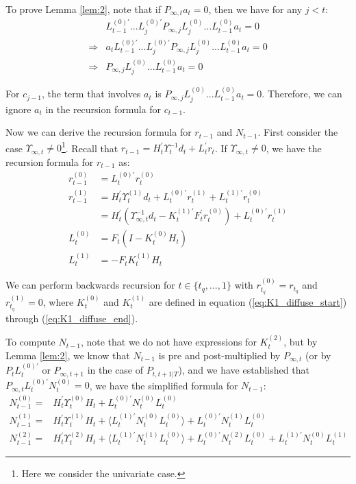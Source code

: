 \documentclass[12pt]{article}
\numberwithin{equation}{section}
\begin{document}
To prove Lemma \ref{lem:2}, note that if $P_{\infty,t}a_t=0$, then we have for any $j<t$:
\begin{align*}
    & L_{t-1}^{(0)'}...L_{j}^{(0)'}P_{\infty,j}L_{j}^{(0)}...L_{t-1}^{(0)}a_t=0 \\
    \Rightarrow & a_tL_{t-1}^{(0)'}...L_{j}^{(0)'}P_{\infty,j}L_{j}^{(0)}...L_{t-1}^{(0)}a_t=0 \\
    \Rightarrow & P_{\infty,j}L_{j}^{(0)}...L_{t-1}^{(0)}a_t=0 
\end{align*}

For $c_{j-1}$, the term that involves $a_t$ is $P_{\infty,j}L_{j}^{(0)}...L_{t-1}^{(0)}a_t=0$. Therefore, we can ignore $a_t$ in the recursion formula for $c_{t-1}$. 

Now we can derive the recursion formula for $r_{t-1}$ and $N_{t-1}$. First consider the case $\Upsilon_{\infty,t}\neq0$\footnote{Here we consider the univariate case.}. Recall that $r_{t-1} = H_t^{'}\Upsilon_{t}^{-1}d_t + L_t^{'}r_t$. If $\Upsilon_{\infty,t}\neq0$, we have the recursion formula for $r_{t-1}$ as:
\begin{align*}
    r_{t-1}^{(0)} &= L_t^{(0)'}r_t^{(0)} \\
    r_{t-1}^{(1)} &= H_t^{'}\Upsilon_{t}^{(1)}d_t+L_t^{(0)'}r_t^{(1)} + L_t^{(1)'}r_t^{(0)} \\
        &= H_t^{'}(\Upsilon_{\infty,t}^{-1}d_t-K_t^{(1)'}F_t^{'}r_t^{(0)}) + L_t^{(0)'}r_t^{(1)} \\
    L_t^{(0)} &= F_t(I-K_t^{(0)}H_t) \\
    L_t^{(1)} &= -F_tK_t^{(1)}H_t 
\end{align*}

We can perform backwards recursion for $t\in\{t_q,...,1\}$ with $r_{t_q}^{(0)}=r_{t_q}$ and $r_{t_q}^{(1)}=0$, where $K_t^{(0)}$ and $K_t^{(1)}$ are defined in equation (\ref{eq:K1_diffuse_start}) through (\ref{eq:K1_diffuse_end}). 

To compute $N_{t-1}$, note that we do not have expressions for $K_t^{(2)}$, but by Lemma \ref{lem:2}, we know that $N_{t-1}$ is pre and post-multiplied by $P_{\infty,t}$ (or by $P_{t}L_{t}^{(0)'}$ or $P_{\infty,t+1}$ in the case of $P_{t,t+1|T}$), and we have established that $P_{\infty,t}L_t^{(0)'}N_{t}^{(0)}=0$, we have the simplified formula for $N_{t-1}$:
\begin{align*}
    N_{t-1}^{(0)} =& H_t^{'}\Upsilon_t^{(0)}H_t + L_t^{(0)'}N_t^{(0)}L_t^{(0)} \\
    N_{t-1}^{(1)} =& H_t^{'}\Upsilon_t^{(1)}H_t + \langle L_t^{(1)'}N_t^{(0)}L_t^{(0)}\rangle + L_t^{(0)'}N_t^{(1)}L_t^{(0)} \\
    N_{t-1}^{(2)} =& H_t^{'}\Upsilon_t^{(2)}H_t + \langle L_t^{(1)'}N_t^{(1)}L_t^{(0)}\rangle + L_t^{(0)'}N_t^{(2)}L_t^{(0)}
        + L_t^{(1)'}N_t^{(0)}L_t^{(1)}
\end{align*}
\end{document}
